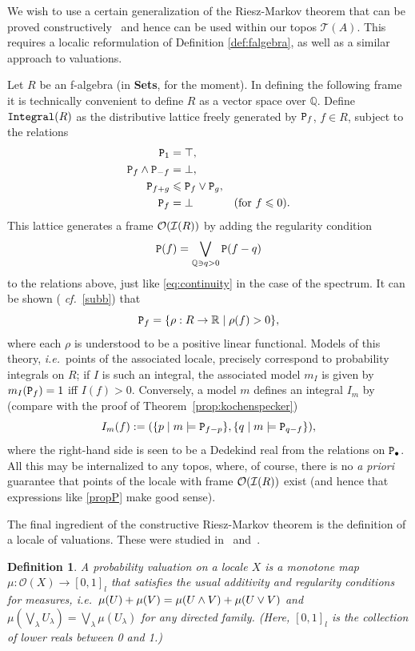 \documentclass[11pt]{article}
\newcommand{\Q}{\mathbb{Q}}
\newcommand{\beq}{\begin{equation}}
\newcommand{\eeq}{\end{equation}}
\newcommand{\Sets}{\mbox{\textbf{Sets}}}
\newcommand{\raw}{\rightarrow} \newcommand{\rat}{\mapsto}
\newcommand{\er}{\eqref}
\newcommand{\lm}{\lambda} \newcommand{\Lm}{\Lambda}
\newcommand{\rh}{\rho} \newcommand{\sg}{\sigma}
\newcommand{\CO}{{\mathcal O}} \newcommand{\CP}{{\mathcal P}}
\newcommand{\alg}[1]{\ensuremath{#1}}
\newcommand{\asstopos}{\ensuremath{\mathcal{T}}}
\newcommand{\prop}[1]{\ensuremath{\mbox{\texttt{#1}}}}
\newcommand{\TA}{\mathcal{T}(A)}
\newcommand{\ie}{\textit{i.e.}}
\renewcommand{\TA}{\asstopos(\alg{A})}
\newtheorem{definition}[theorem]{Definition}
\begin{document}
We wish to use a certain generalization of the Riesz-Markov theorem that
can be proved
constructively~\cite{Coquand/Spitters:integrals-valuations} and hence
can be used within our topos $\TA$. This requires a localic reformulation of
Definition \ref{def:falgebra}, as well as a similar approach to
valuations.

Let $R$ be an f-algebra (in \Sets, for the moment).  In defining the following
frame it is technically convenient to define $R$ as a vector space over $\Q$.
Define $\prop{Integral}(R)$ as the distributive lattice freely
generated by $\prop{P}_f$, $f\in R$, subject to the
relations
\begin{align*}
                \prop{P}_1&=\top,\\
  \prop{P}_f\wedge \prop{P}_{-f} & =\bot, \\
  \prop{P}_{f+g}            & \leqslant \prop{P}_{f}\vee \prop{P}_g,\\
  \prop{P}_f            & =\bot			& (\mbox{for }f\leqslant 0).
\end{align*}
This lattice generates a
frame $\mathcal{O}({\mathcal I}(R))$ by adding the regularity condition
\beq\prop{P}(f)=\bigvee_{\Q\ni q>0}\prop{P}(f-q)\eeq to the relations above,
just
like \eqref{eq:continuity} in the case of the spectrum. It can be shown ({\it
cf.}\ \er{subb})
that
\beq \prop{P}_f=\{\rho:R\raw \R \mid \rho(f) > 0\},\label{propP}\eeq
where each $\rh$ is understood to be a positive linear functional.
Models of this theory, \ie\ points of the associated locale,  precisely
correspond to probability integrals
on $R$; if $I$ is such an integral, the associated model $m_I$ is given by
$m_I(\prop{P}_f)=1$ iff $I(f)>0$.
Conversely, a model $m$ defines an integral $I_m$ by (compare with the
proof of Theorem~\ref{prop:kochenspecker})
 $$
I_m(f):=(\{p\mid
m\models \prop{P}_{f-p}\}, \{q\mid
m\models \prop{P}_{q-f}\}), $$
where the right-hand side is seen to be a Dedekind real from the
relations on $\prop{P}_\bullet$.
All this may be internalized to any topos, where, of course, there is
no {\it a priori} guarantee that points of the locale with frame
$\mathcal{O}({\mathcal I}(R))$ exist (and hence that expressions like \er{propP} make
good
sense).

The final ingredient of the constructive  Riesz-Markov theorem is the
definition of a locale of valuations. These were studied in~\cite{heckmann}
and~\cite{vickersintegration}.
\begin{definition}
  A {\it probability valuation} on a locale $X$ is a monotone map
  $\mu:\CO(X)\raw [0,1]_l$ that satisfies the usual additivity and
  regularity conditions for measures, \ie\ $\mu(U)+\mu(V)=\mu(U\wedge
  V)+\mu(U\vee V)$ and $\mu(\bigvee_{\lm} U_{\lm}) =\bigvee_{\lm}\mu(
  U_{\lm})$ for any directed family. (Here, $[0,1]_l$ is the
  collection of lower reals between 0 and 1.)
\end{definition}
\end{document}
